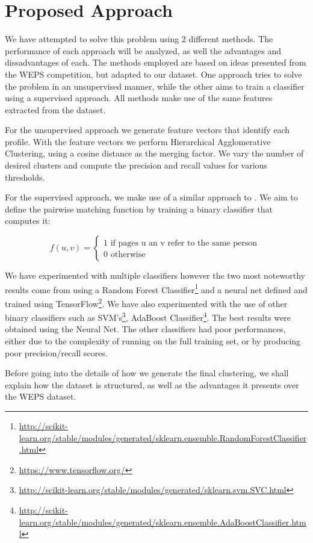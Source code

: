\chapter{Proposed Approach}
\label{chapter:proposed-approach}
We have attempted to solve this problem using 2 different methods. The performance
of each approach will be analyzed, as well the advantages and dissadvantages of
each. The methods employed are based on ideas presented from the WEPS competition,
but adapted to our dataset. One approach tries to solve the problem in an unsupervised
manner, while the other aims to train a classifier using a supervised
approach. All methods make use of the same features extracted from the dataset.

For the unsupervised approach we generate feature vectors that identify each
profile. With the feature vectors we perform Hierarchical Agglomerative Clustering,
using a cosine distance as the merging factor. We vary the number of desired
clusters and compute the precision and recall values for various thresholds.

For the supervised approach, we make use of a similar approach to
\cite{connection-analysis}. We aim to define the pairwise matching function by
training a binary classifier that computes it:

\[ f(u, v) =
    \left\{
        \begin{array}{ll}
            1 \mbox{ if pages u an v refer to the same person } \\
            0 \mbox{ otherwise }
        \end{array}
    \right.
\]

We have experimented with multiple classifiers however the two most noteworthy
results come from using a Random Forest Classifier\footnote{\url{http://scikit-learn.org/stable/modules/generated/sklearn.ensemble.RandomForestClassifier.html}}
and a neural net defined and trained using TensorFlow\footnote{\url{https://www.tensorflow.org/}}.
We have also experimented with the use of other binary classifiers such as SVM's\footnote{\url{http://scikit-learn.org/stable/modules/generated/sklearn.svm.SVC.html}},
AdaBoost Classifier\footnote{\url{http://scikit-learn.org/stable/modules/generated/sklearn.ensemble.AdaBoostClassifier.html}}.
The best results were obtained using the Neural Net. The other classifiers
had poor performances, either due to the complexity of running on the full training set,
or by producing poor precision/recall scores.

Before going into the details of how we generate the final clustering, we shall
explain how the dataset is structured, as well as the advantages it presents
over the WEPS dataset.

